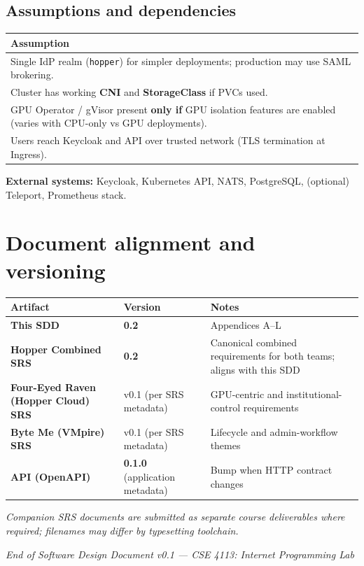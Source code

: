 \documentclass[12pt,a4paper]{article}
\newcommand{\ByteMeHeading}{Byte Me}
\begin{document}
\subsection{Assumptions and dependencies}
\begin{tabularx}{\textwidth}{@{}X@{}}
  \toprule
  \textbf{Assumption} \\
  \midrule
  Single IdP realm (\texttt{hopper}) for simpler deployments; production may use SAML brokering. \\
  Cluster has working \textbf{CNI} and \textbf{StorageClass} if PVCs used. \\
  GPU Operator / gVisor present \textbf{only if} GPU isolation features are enabled (varies with CPU-only vs GPU deployments). \\
  Users reach Keycloak and API over trusted network (TLS termination at Ingress). \\
  \bottomrule
\end{tabularx}

\vspace{0.5em}
\noindent\textbf{External systems:} Keycloak, Kubernetes API, NATS, PostgreSQL, (optional) Teleport, Prometheus stack.

\section{Document alignment and versioning}
\label{app:alignment}

\begin{tabularx}{\textwidth}{@{}L{4.2cm} X X@{}}
  \toprule
  \textbf{Artifact} & \textbf{Version} & \textbf{Notes} \\
  \midrule
  \textbf{This SDD} & \textbf{0.2} & Appendices A--L \\
  \textbf{Hopper Combined SRS} & \textbf{0.2} & Canonical combined requirements for both teams; aligns with this SDD \\
  \textbf{Four-Eyed Raven (Hopper Cloud) SRS} & v0.1 (per SRS metadata) & GPU-centric and institutional-control requirements \\
  \textbf{\ByteMeHeading{} (VMpire) SRS} & v0.1 (per SRS metadata) & Lifecycle and admin-workflow themes \\
  \textbf{API (OpenAPI)} & \textbf{0.1.0} (application metadata) & Bump when HTTP contract changes \\
  \bottomrule
\end{tabularx}

\vspace{0.75em}
\noindent\textit{Companion SRS documents are submitted as separate course deliverables where required; filenames may differ by typesetting toolchain.}

\vspace{1.5em}
\begin{center}
\small\textit{End of Software Design Document v0.1 --- CSE 4113: Internet Programming Lab}
\end{center}
\end{document}
